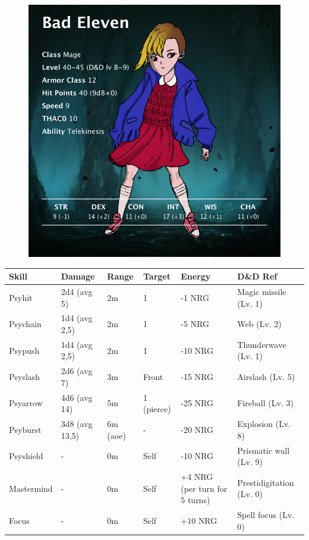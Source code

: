 \begin{figure}[H]
	\centering
	\includegraphics[width=0.8\linewidth]{images/visual_stats/badeleven.png}
\end{figure}

\vspace*{2mm}

\begin{center}
	\begin{tabular}[c]{| p{2cm} | p{} | p{} | p{} | p{2cm} | p{} | }
		\hline
		\textbf{Skill} & \textbf{Damage} & \textbf{Range} & \textbf{Target} & \textbf{Energy} & \textbf{D\&D Ref}\\
		\hline
		Psyhit & 2d4 (avg 5) & 2m & 1 & -1 NRG & Magic missile (Lv. 1)\\
		\hline
		Psychain & 1d4 (avg 2,5) & 2m & 1 & -5 NRG & Web (Lv. 2)\\
		\hline
		Psypush & 1d4 (avg 2,5) & 2m & 1 & -10 NRG & Thunderwave (Lv. 1)\\
		\hline
		Psyslash & 2d6 (avg 7) & 3m & Front & -15 NRG & Airslash (Lv. 5)\\
		\hline
		Psyarrow & 4d6 (avg 14) & 5m & 1 (pierce) & -25 NRG & Fireball (Lv. 3)\\
		\hline
		Psyburst & 3d8 (avg 13,5) & 6m (aoe) & - & -20 NRG & Explosion (Lv. 8)\\
		\hline
		Psyshield & - & 0m & Self & -10 NRG & Prismatic wall (Lv. 9)\\
		\hline
		Mastermind & - & 0m & Self & +4 NRG (per turn for 5 turns) & Prestidigitation (Lv. 0)\\
		\hline
		Focus & - & 0m & Self & +10 NRG & Spell focus (Lv. 0)\\
		\hline
	\end{tabular}
\end{center}


